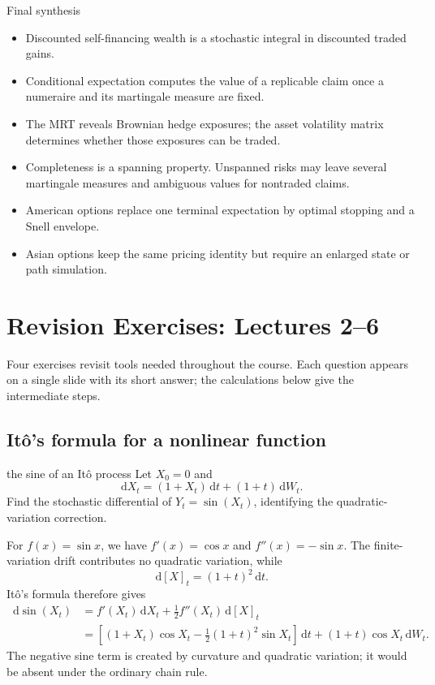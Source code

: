 \documentclass[10pt]{article}
\newcommand{\1}{\mathbf 1}
\newcommand{\dd}{\,\mathrm d}
\theoremstyle{definition}
\begin{document}
\begin{keyidea}{Final synthesis}
\begin{itemize}
  \item Discounted self-financing wealth is a stochastic integral in
        discounted traded gains.
  \item Conditional expectation computes the value of a replicable claim
        once a numeraire and its martingale measure are fixed.
  \item The MRT reveals Brownian hedge exposures; the asset volatility matrix
        determines whether those exposures can be traded.
  \item Completeness is a spanning property. Unspanned risks may leave
        several martingale measures and ambiguous values for nontraded claims.
  \item American options replace one terminal expectation by optimal stopping
        and a Snell envelope.
  \item Asian options keep the same pricing identity but require an enlarged
        state or path simulation.
\end{itemize}
\end{keyidea}

\section{Revision Exercises: Lectures 2--6}

Four exercises revisit tools needed throughout the course. Each question
appears on a single slide with its short answer; the calculations below
give the intermediate steps.

\subsection{It\^o's formula for a nonlinear function}

\begin{studentexercise}{the sine of an It\^o process}
Let \(X_0=0\) and
\[
\dd X_t=(1+X_t)\dd t+(1+t)\dd W_t.
\]
Find the stochastic differential of \(Y_t=\sin(X_t)\), identifying the
quadratic-variation correction.
\end{studentexercise}
\begin{shortsolution}
For \(f(x)=\sin x\), we have \(f'(x)=\cos x\) and
\(f''(x)=-\sin x\). The finite-variation drift contributes no quadratic
variation, while
\[
\dd[X]_t=(1+t)^2\dd t.
\]
It\^o's formula therefore gives
\[
\begin{aligned}
\dd\sin(X_t)
&=f'(X_t)\dd X_t+\tfrac12f''(X_t)\dd[X]_t\\
&=\boxed{\left[(1+X_t)\cos X_t
 -\tfrac12(1+t)^2\sin X_t\right]\dd t
 +(1+t)\cos X_t\dd W_t.}
\end{aligned}
\]
The negative sine term is created by curvature and quadratic variation; it
would be absent under the ordinary chain rule.
\end{shortsolution}
\end{document}
